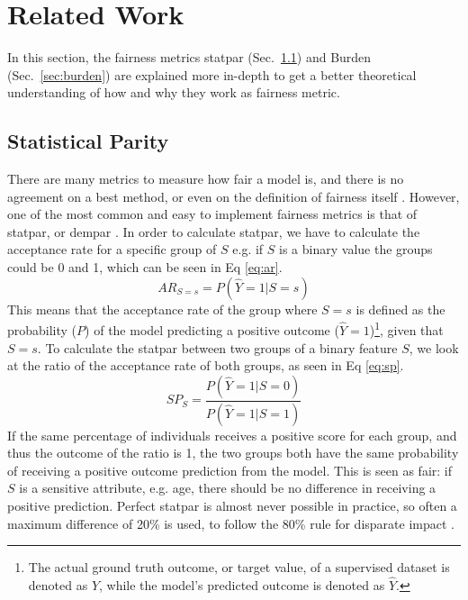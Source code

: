 \documentclass[runningheads]{llncs}
\begin{document}
\section{Related Work}\label{sec:relatedwork}

In this section, the fairness metrics \gls{statpar} (Sec.~\ref{sec:sp}) and \gls{Burden} (Sec.~\ref{sec:burden}) are explained more in-depth to get a better theoretical understanding of how and why they work as fairness metric.

\subsection{Statistical Parity}\label{sec:sp}
There are many metrics to measure how fair a model is, and there is no agreement on a best method, or even on the definition of fairness itself \cite{chouldechova2018frontiers}. However, one of the most common and easy to implement fairness metrics is that of \gls{statpar}, or \gls{dempar} \cite{kamiran2009demographicparity}.
In order to calculate \gls{statpar}, we have to calculate the acceptance rate for a specific group of $S$ e.g. if $S$ is a binary value the groups could be 0 and 1, which can be seen in Eq \ref{eq:ar}.
\begin{equation}\label{eq:ar}
 AR_{S=s} = P(\hat{Y}=1|S=s)
\end{equation}
This means that the acceptance rate of the group where $S=s$ is defined as the probability ($P$) of the model predicting a positive outcome ($\hat{Y}=1$)\footnote{The actual ground truth outcome, or target value, of a supervised dataset is denoted as $Y$, while the model's predicted outcome is denoted as $\hat{Y}$.}, given that $S=s$. To calculate the \gls{statpar} between two groups of a binary feature $S$, we look at the ratio of the acceptance rate of both groups, as seen in Eq \ref{eq:sp}.
\begin{equation}\label{eq:sp}
    SP_{S} = \frac{P(\hat{Y}=1|S=0)}{P(\hat{Y}=1|S=1)} 
\end{equation}
If the same percentage of individuals receives a positive score for each group, and thus the outcome of the ratio is 1, the two groups both have the same probability of receiving a positive outcome prediction from the model. This is seen as fair: if $S$ is a sensitive attribute, e.g. age, there should be no difference in receiving a positive prediction. Perfect \gls{statpar} is almost never possible in practice, so often a maximum difference of 20\% is used, to follow the 80\% rule for disparate impact \cite{feldman2015certifying}.
\end{document}
